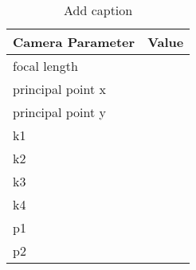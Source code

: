 \begin{table}[htbp]
  \centering
  \caption{Add caption}
    \begin{tabular}{lr}
   	\toprule
    Camera Parameter & Value \\
    \midrule
    focal length &  \\
    principal point x &  \\
    principal point y &  \\
    k1    &  \\
    k2    &  \\
    k3    &  \\
    k4    &  \\
    p1    &  \\
    p2    &  \\
    \bottomrule
    \end{tabular}%
  \label{tab:addlabel}%
\end{table}%
